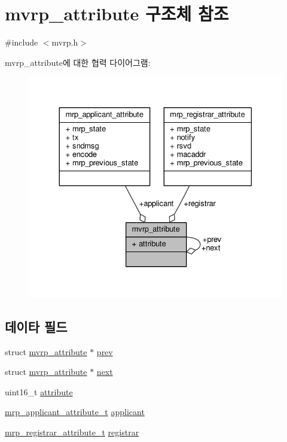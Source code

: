 \hypertarget{structmvrp__attribute}{}\section{mvrp\+\_\+attribute 구조체 참조}
\label{structmvrp__attribute}


{\ttfamily \#include $<$mvrp.\+h$>$}



mvrp\+\_\+attribute에 대한 협력 다이어그램\+:
\nopagebreak
\begin{figure}[H]
\begin{center}
\leavevmode
\includegraphics[width=330pt]{structmvrp__attribute__coll__graph}
\end{center}
\end{figure}
\subsection*{데이타 필드}
\begin{DoxyCompactItemize}
\item 
struct \hyperlink{structmvrp__attribute}{mvrp\+\_\+attribute} $\ast$ \hyperlink{structmvrp__attribute_afdae1b56171b26cdfd390a2b5120cf08}{prev}
\item 
struct \hyperlink{structmvrp__attribute}{mvrp\+\_\+attribute} $\ast$ \hyperlink{structmvrp__attribute_a6443b8a395d0b5481049fdb981ca012a}{next}
\item 
uint16\+\_\+t \hyperlink{structmvrp__attribute_a3b3d3596e1475518967e76e0e222a458}{attribute}
\item 
\hyperlink{mrp_8h_a958c5bcf98d8118f9ba46d7b44862232}{mrp\+\_\+applicant\+\_\+attribute\+\_\+t} \hyperlink{structmvrp__attribute_a9ee7e01253c78c410bf44f18a6372d92}{applicant}
\item 
\hyperlink{mrp_8h_a74a88ecd39ca17a8765eb9cbf15b3da9}{mrp\+\_\+registrar\+\_\+attribute\+\_\+t} \hyperlink{structmvrp__attribute_a9e893db6ef01e9cda330159f5d3ee764}{registrar}
\end{DoxyCompactItemize}


